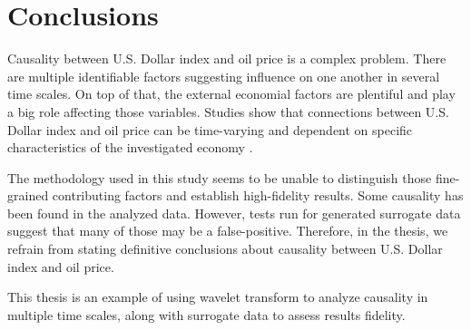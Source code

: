 \section{Conclusions} \label{sec:conclusions}

Causality between U.S. Dollar index and oil price is a complex problem.
There are multiple identifiable factors suggesting influence on one another in several time scales.
On top of that, the external economial factors are plentiful and play a big role affecting those variables.
Studies show that connections between U.S. Dollar index and oil price can be time-varying and dependent on specific characteristics of the investigated economy \cite{2020-beckmann}. 

The methodology used in this study seems to be unable to distinguish those fine-grained contributing factors and establish high-fidelity results.
Some causality has been found in the analyzed data.
However, tests run for generated surrogate data suggest that many of those may be a false-positive.
Therefore, in the thesis, we refrain from stating definitive conclusions about causality between U.S. Dollar index and oil price.

This thesis is an example of using wavelet transform to analyze causality in multiple time scales, 
along with surrogate data to assess results fidelity.
